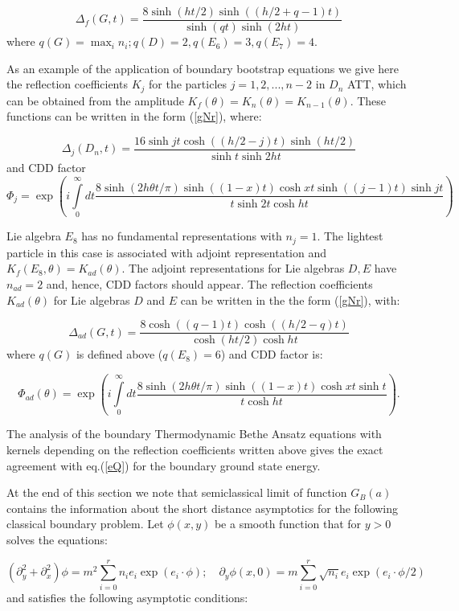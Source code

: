 \documentclass[a4paper,12pt]{article}
\begin{document}
\begin{equation}
\Delta _f(G,t)=\frac{8\sinh \left( ht/2\right) \sinh ((h/2+q-1)t)}{\sinh
(qt)\sinh (2ht)}  \label{dE}
\end{equation}
where $q(G)=\max_in_i;q(D)=2,q(E_6)=3,q(E_7)=4$.

As an example of the application of boundary bootstrap equations we give
here the reflection coefficients $K_j$ for the particles 
$j=1,2,...,n-2$ in $ D_n$ ATT, which can be obtained 
from the amplitude $K_f\left( \theta
\right) =K_n(\theta )=K_{n-1}(\theta )$. These functions can be written in
the form (\ref{gNr}), where:

\[
\Delta _j(D_n,t)=\frac{16\sinh jt\cosh ((h/2-j)t)
\sinh (ht/2)}{\sinh t\sinh2ht}
\]
and CDD factor 
\[
\Phi _j=\exp \left( i\int\limits_0^\infty dt\frac{8\sinh (2h\theta t/\pi )\sinh
((1-x)t)\cosh xt\sinh ((j-1)t)\sinh jt}{t\sinh 2t\cosh ht}\right) 
\]

Lie algebra $E_8$ has no fundamental representations with $n_j=1$. The
lightest particle in this case is associated with adjoint representation and 
$K_f(E_8,\theta )=K_{ad}(\theta )$. The adjoint representations for Lie
algebras $D,E$ have $n_{ad}=2$ and, hence, CDD factors should appear. The
reflection coefficients $K_{ad}(\theta )$ for Lie algebras $D$ and $E$ can be 
written in the the form (\ref{gNr}), with:

\[
\Delta _{ad}(G,t)=
\frac{8\cosh ((q-1)t)\cosh ((h/2-q)t)}{\cosh (ht/2)\cosh ht}
\]
where $q(G)$ is defined above ($q(E_8)=6$) and CDD factor is:

\[
\Phi _{ad}(\theta )=\exp \left( i\int\limits_0^\infty dt
\frac{8\sinh (2h\theta t/\pi )\sinh((1-x)t)\cosh xt\sinh t}
{t\cosh ht}\right) .
\]

The analysis of the boundary Thermodynamic Bethe Ansatz equations with
kernels depending on the reflection coefficients written above gives the
exact agreement with eq.(\ref{eQ}) for the boundary ground state energy.


At the end of this section we note that semiclassical limit of function $
G_B(a)$ contains the information about the short distance asymptotics for
the following classical boundary problem. Let $\phi (x,y)$ be a smooth
function that for $y>0$ solves the equations:

\begin{displaymath}
(\partial _y^2+\partial _x^2)\phi =m^2\sum_{i=0}^rn_ie_i\exp (e_i\cdot \phi
);\quad \partial _y\phi (x,0)=m\sum\limits_{i=0}^r\sqrt{n_i}e_i\exp
(e_i\cdot \phi /2)  
\end{displaymath}
and satisfies the following asymptotic conditions:
\end{document}
